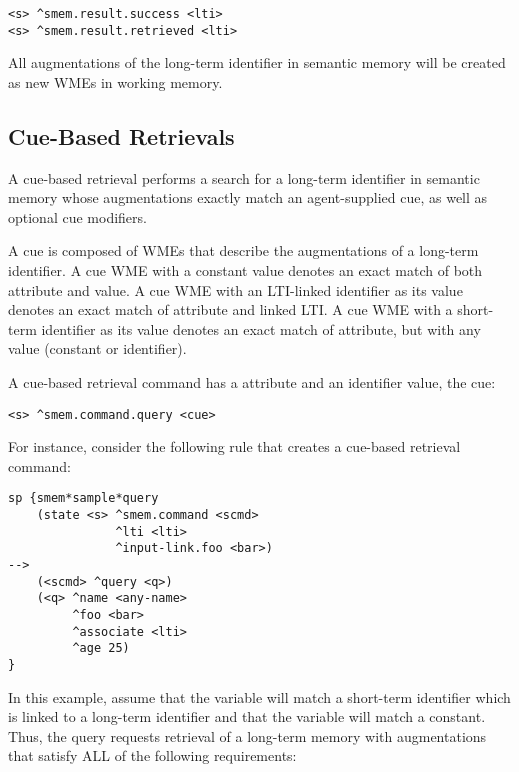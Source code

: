 \begin{verbatim}
<s> ^smem.result.success <lti>
<s> ^smem.result.retrieved <lti>
\end{verbatim}

All augmentations of the long-term identifier in semantic memory will be created as new WMEs in working memory.

\subsection{Cue-Based Retrievals}

A cue-based retrieval performs a search for a long-term identifier in semantic memory whose augmentations exactly match an agent-supplied cue, as well as optional cue modifiers.

A cue is composed of WMEs that describe the augmentations of a long-term identifier.
A cue WME with a constant value denotes an exact match of both attribute and value.
A cue WME with an LTI-linked identifier as its value denotes an exact match of attribute and linked LTI.
A cue WME with a short-term identifier as its value denotes an exact match of attribute, but with any value (constant or identifier).

A cue-based retrieval command has a  attribute and an identifier value, the cue:

\begin{verbatim}
<s> ^smem.command.query <cue>
\end{verbatim}

For instance, consider the following rule that creates a cue-based retrieval command:

\begin{verbatim}
sp {smem*sample*query
    (state <s> ^smem.command <scmd>
               ^lti <lti>
               ^input-link.foo <bar>)
-->
    (<scmd> ^query <q>)
    (<q> ^name <any-name>
         ^foo <bar>
         ^associate <lti>
         ^age 25)
}
\end{verbatim}

In this example, assume that the  variable will match a short-term identifier which is linked to a long-term identifier and that the  variable will match a constant.
Thus, the query requests retrieval of a long-term memory with augmentations that satisfy ALL of the following requirements:

